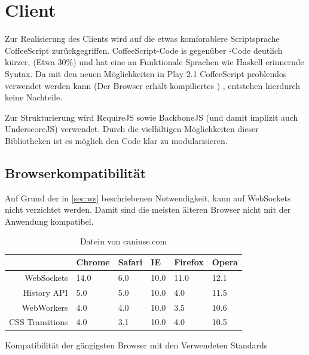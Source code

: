 \section{Client}

Zur Realisierung des Clients wird auf die etwas komforablere Scriptsprache CoffeeScript
zurückgegriffen. CoffeeScript-Code is gegenüber -Code deutlich kürzer, (Etwa 30\%) und hat
eine an Funktionale Sprachen wie Haskell erinnernde Syntax. Da mit den neuen Möglichkeiten in Play
2.1 CoffeeScript problemlos verwendet werden kann (Der Browser erhält kompiliertes ) ,
entstehen hierdurch keine Nachteile.

Zur Strukturierung wird RequireJS sowie BackboneJS (und damit implizit auch UnderscoreJS) verwendet.
Durch die vielfältigen Möglichkeiten dieser Bibliotheken ist es möglich den Code klar zu
modularisieren.

\subsection{Browserkompatibilität}
\label{sec:comp}

Auf Grund der in \ref{sec:ws} beschriebenen Notwendigkeit, kann auf WebSockets nicht verzichtet
werden. Damit sind die meisten älteren Browser nicht mit der Anwendung kompatibel. 

\begin{table}[h]
\centering
\begin{tabular}{rlllll}
                  & \textbf{Chrome} & \textbf{Safari} & \textbf{IE} & \textbf{Firefox} 
                  & \textbf{Opera} \\\hline
  WebSockets      & 14.0            & 6.0             & 10.0        & 11.0             & 12.1  \\
  History API     & 5.0             & 5.0             & 10.0        & 4.0              & 11.5  \\
  WebWorkers      & 4.0             & 4.0             & 10.0        & 3.5              & 10.6  \\
  CSS Transitions & 4.0             & 3.1             & 10.0        & 4.0              & 10.5  \\

\end{tabular}
\label{tab:comp}
\caption{Kompatibilität der gängigsten Browser mit den Verwendeten Standards}
  \caption*{Datein von caniuse.com}
\end{table}

